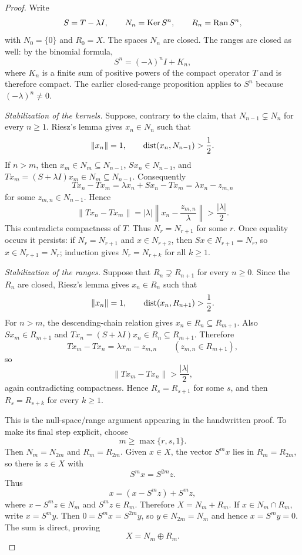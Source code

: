 \begin{proof}
Write
\[
  S=T-\lambda I,
  \qquad
  N_n=\operatorname{Ker} S^n,
  \qquad
  R_n=\operatorname{Ran} S^n,
\]
with $N_0=\{0\}$ and $R_0=X$.  The spaces $N_n$ are closed.  The ranges are
closed as well: by the binomial formula,
\[
  S^n=(-\lambda)^nI+K_n,
\]
where $K_n$ is a finite sum of positive powers of the compact operator $T$ and
is therefore compact.  The earlier closed-range proposition applies to
$S^n$ because $(-\lambda)^n\ne0$.

\emph{Stabilization of the kernels.}
Suppose, contrary to the claim, that
$N_{n-1}\subsetneq N_n$ for every $n\ge1$.  Riesz's lemma gives
$x_n\in N_n$ such that
\[
  \|x_n\|=1,
  \qquad
  \operatorname{dist}(x_n,N_{n-1})>\frac12.
\]
If $n>m$, then $x_m\in N_m\subseteq N_{n-1}$,
$Sx_n\in N_{n-1}$, and $Tx_m=(S+\lambda I)x_m\in N_m\subseteq N_{n-1}$.
Consequently
\[
  Tx_n-Tx_m
  =\lambda x_n+Sx_n-Tx_m
  =\lambda x_n-z_{m,n}
\]
for some $z_{m,n}\in N_{n-1}$.  Hence
\[
  \|Tx_n-Tx_m\|
  =|\lambda|\left\|x_n-\frac{z_{m,n}}{\lambda}\right\|
  >\frac{|\lambda|}{2}.
\]
This contradicts compactness of $T$.  Thus $N_r=N_{r+1}$ for some $r$.
Once equality occurs it persists: if $N_r=N_{r+1}$ and
$x\in N_{r+2}$, then $Sx\in N_{r+1}=N_r$, so
$x\in N_{r+1}=N_r$; induction gives $N_r=N_{r+k}$ for all $k\ge1$.

\emph{Stabilization of the ranges.}
Suppose that $R_n\supsetneq R_{n+1}$ for every $n\ge0$.  Since the $R_n$ are
closed, Riesz's lemma gives $x_n\in R_n$ such that
\[
  \|x_n\|=1,
  \qquad
  \operatorname{dist}(x_n,R_{n+1})>\frac12.
\]
For $n>m$, the descending-chain relation gives
$x_n\in R_n\subseteq R_{m+1}$.  Also $Sx_m\in R_{m+1}$ and
$Tx_n=(S+\lambda I)x_n\in R_n\subseteq R_{m+1}$.  Therefore
\[
  Tx_m-Tx_n=\lambda x_m-z_{m,n}
  \qquad(z_{m,n}\in R_{m+1}),
\]
so
\[
  \|Tx_m-Tx_n\|>\frac{|\lambda|}{2},
\]
again contradicting compactness.  Hence $R_s=R_{s+1}$ for some $s$, and then
$R_s=R_{s+k}$ for every $k\ge1$.

This is the null-space/range argument appearing in the handwritten proof.  To
make its final step explicit, choose
\[
  m\ge\max\{r,s,1\}.
\]
Then $N_m=N_{2m}$ and $R_m=R_{2m}$.  Given $x\in X$, the vector $S^mx$ lies
in $R_m=R_{2m}$, so there is $z\in X$ with
\[
  S^mx=S^{2m}z.
\]
Thus
\[
  x=(x-S^mz)+S^mz,
\]
where $x-S^mz\in N_m$ and $S^mz\in R_m$.  Therefore $X=N_m+R_m$.
If $x\in N_m\cap R_m$, write $x=S^my$.  Then
$0=S^mx=S^{2m}y$, so $y\in N_{2m}=N_m$ and hence $x=S^my=0$.  The sum is
direct, proving
\[
  X=N_m\oplus R_m.
\]
\end{proof}


